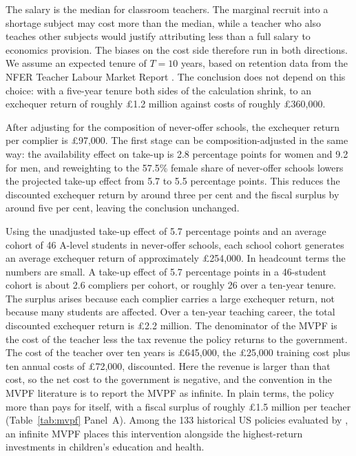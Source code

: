 The salary is the median for classroom teachers. The marginal recruit into a shortage subject may cost more than the median, while a teacher who also teaches other subjects would justify attributing less than a full salary to economics provision. The biases on the cost side therefore run in both directions. We assume an expected tenure of $T = 10$ years, based on retention data from the NFER Teacher Labour Market Report \citep{worth2024teacher}. The conclusion does not depend on this choice: with a five-year tenure both sides of the calculation shrink, to an exchequer return of roughly \pounds 1.2 million against costs of roughly \pounds 360,000.

After adjusting for the composition of never-offer schools, the exchequer return per complier is \pounds 97,000. The first stage can be composition-adjusted in the same way: the availability effect on take-up is 2.8 percentage points for women and 9.2 for men, and reweighting to the 57.5\% female share of never-offer schools lowers the projected take-up effect from 5.7 to 5.5 percentage points. This reduces the discounted exchequer return by around three per cent and the fiscal surplus by around five per cent, leaving the conclusion unchanged.

Using the unadjusted take-up effect of 5.7 percentage points and an average cohort of 46 A-level students in never-offer schools, each school cohort generates an average exchequer return of approximately \pounds 254,000. In headcount terms the numbers are small. A take-up effect of 5.7 percentage points in a 46-student cohort is about 2.6 compliers per cohort, or roughly 26 over a ten-year tenure. The surplus arises because each complier carries a large exchequer return, not because many students are affected. Over a ten-year teaching career, the total discounted exchequer return is \pounds 2.2 million. The denominator of the MVPF is the cost of the teacher less the tax revenue the policy returns to the government. The cost of the teacher over ten years is \pounds 645,000, the \pounds 25,000 training cost plus ten annual costs of \pounds 72,000, discounted. Here the revenue is larger than that cost, so the net cost to the government is negative, and the convention in the MVPF literature is to report the MVPF as infinite. In plain terms, the policy more than pays for itself, with a fiscal surplus of roughly \pounds 1.5 million per teacher (Table~\ref{tab:mvpf} Panel~A). Among the 133 historical US policies evaluated by \citet{hendren2020mvpf}, an infinite MVPF places this intervention alongside the highest-return investments in children's education and health.

